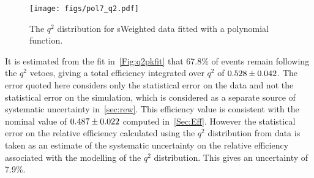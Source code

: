 \begin{figure}[h!]
  \def\nh{0.7\textwidth}
  \centering
  \texttt{[image: figs/pol7\_q2.pdf]}
  
    \caption{The $q^{2}$ distribution for sWeighted \LbK data fitted with a polynomial function.}
  \label{Fig:q2pkfit}
\end{figure}

It is estimated from the fit in~\autoref{Fig:q2pkfit} that 67.8\% of \LbK events remain following the $q^{2}$ vetoes, giving a total efficiency integrated over $q^{2}$ of $\twq2$. The error quoted here considers only the statistical error on the \LbK data and not the statistical error on the simulation, which is considered as a separate source of systematic uncertainty in~\autoref{sec:rew}.  This efficiency value is consistent with the nominal value of $0.487\pm0.022$ computed in~\autoref{Sec:Eff}. However the statistical error on the relative efficiency calculated using the $q^{2}$ distribution from \LbK data is taken as an estimate of the systematic uncertainty on the relative efficiency associated with the modelling of the $q^{2}$ distribution. This gives an uncertainty of 7.9\%. %

